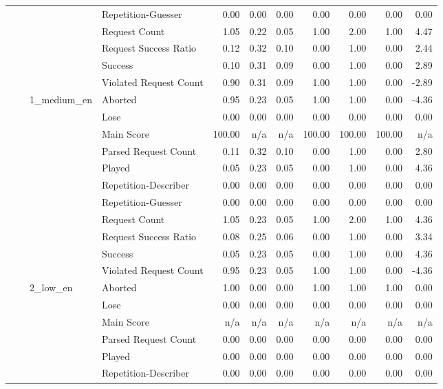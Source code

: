 \begin{tabular}{llllrrrrrrr}
 &  &  & Repetition-Guesser & 0.00 & 0.00 & 0.00 & 0.00 & 0.00 & 0.00 & 0.00 \\
 &  &  & Request Count & 1.05 & 0.22 & 0.05 & 1.00 & 2.00 & 1.00 & 4.47 \\
 &  &  & Request Success Ratio & 0.12 & 0.32 & 0.10 & 0.00 & 1.00 & 0.00 & 2.44 \\
 &  &  & Success & 0.10 & 0.31 & 0.09 & 0.00 & 1.00 & 0.00 & 2.89 \\
 &  &  & Violated Request Count & 0.90 & 0.31 & 0.09 & 1.00 & 1.00 & 0.00 & -2.89 \\
\cline{3-11}
 &  & \multirow[t]{11}{*}{1_medium_en} & Aborted & 0.95 & 0.23 & 0.05 & 1.00 & 1.00 & 0.00 & -4.36 \\
 &  &  & Lose & 0.00 & 0.00 & 0.00 & 0.00 & 0.00 & 0.00 & 0.00 \\
 &  &  & Main Score & 100.00 & n/a & n/a & 100.00 & 100.00 & 100.00 & n/a \\
 &  &  & Parsed Request Count & 0.11 & 0.32 & 0.10 & 0.00 & 1.00 & 0.00 & 2.80 \\
 &  &  & Played & 0.05 & 0.23 & 0.05 & 0.00 & 1.00 & 0.00 & 4.36 \\
 &  &  & Repetition-Describer & 0.00 & 0.00 & 0.00 & 0.00 & 0.00 & 0.00 & 0.00 \\
 &  &  & Repetition-Guesser & 0.00 & 0.00 & 0.00 & 0.00 & 0.00 & 0.00 & 0.00 \\
 &  &  & Request Count & 1.05 & 0.23 & 0.05 & 1.00 & 2.00 & 1.00 & 4.36 \\
 &  &  & Request Success Ratio & 0.08 & 0.25 & 0.06 & 0.00 & 1.00 & 0.00 & 3.34 \\
 &  &  & Success & 0.05 & 0.23 & 0.05 & 0.00 & 1.00 & 0.00 & 4.36 \\
 &  &  & Violated Request Count & 0.95 & 0.23 & 0.05 & 1.00 & 1.00 & 0.00 & -4.36 \\
\cline{3-11}
 &  & \multirow[t]{11}{*}{2_low_en} & Aborted & 1.00 & 0.00 & 0.00 & 1.00 & 1.00 & 1.00 & 0.00 \\
 &  &  & Lose & 0.00 & 0.00 & 0.00 & 0.00 & 0.00 & 0.00 & 0.00 \\
 &  &  & Main Score & n/a & n/a & n/a & n/a & n/a & n/a & n/a \\
 &  &  & Parsed Request Count & 0.00 & 0.00 & 0.00 & 0.00 & 0.00 & 0.00 & 0.00 \\
 &  &  & Played & 0.00 & 0.00 & 0.00 & 0.00 & 0.00 & 0.00 & 0.00 \\
 &  &  & Repetition-Describer & 0.00 & 0.00 & 0.00 & 0.00 & 0.00 & 0.00 & 0.00 \\

\end{tabular}
